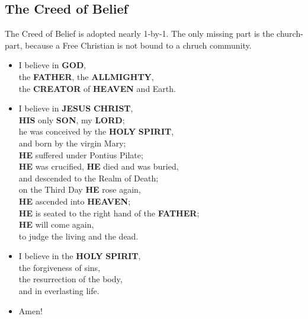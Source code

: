 \documentclass[12pt,a5paper]{article}
\newcommand{\Allmighty}[0]{\textbf{ALLMIGHTY}}
\newcommand{\Christ}[0]{\textbf{CHRIST}}
\newcommand{\Creator}[0]{\textbf{CREATOR}}
\newcommand{\God}[0]{\textbf{GOD}}
\newcommand{\Father}[0]{\textbf{FATHER}}
\newcommand{\He}[0]{\textbf{HE}}
\newcommand{\Heaven}[0]{\textbf{HEAVEN}}
\newcommand{\His}[0]{\textbf{HIS}}
\newcommand{\Holy}[0]{\textbf{HOLY}}
\newcommand{\Jesus}[0]{\textbf{JESUS}}
\newcommand{\Lord}[0]{\textbf{LORD}}
\newcommand{\Son}[0]{\textbf{SON}}
\newcommand{\Spirit}[0]{\textbf{SPIRIT}}
\begin{document}
	\subsection{The Creed of Belief}
		The Creed of Belief is adopted nearly 1-by-1.
		The only missing part is the church-part,
		because a Free Christian is not bound to a chruch community.
		\\
		\begin{itemize}[nosep]
			\item	I believe in {\God},
			\\		the {\Father},
					the {\Allmighty},
			\\		the {\Creator} of {\Heaven} and Earth.
			\item	I believe in {\Jesus} {\Christ},
			\\		{\His} only {\Son},
					my {\Lord};
			\\		he was conceived by the {\Holy} {\Spirit},
			\\		and born by the virgin Mary;
			\\		{\He} suffered under Pontius Pilate;
			\\		{\He} was crucified, {\He} died and was buried,
			\\		and descended to the Realm of Death;
			\\		on the Third Day {\He} rose again,
			\\		{\He} ascended into {\Heaven};
			\\		{\He} is seated to the right hand of the {\Father};
			\\		{\He} will come again,
			\\		to judge the living and the dead.
			\item	I believe in the {\Holy} {\Spirit},
			\\		the forgiveness of sins,
			\\		the resurrection of the body,
			\\		and in everlasting life.
			\item	Amen!
		\end{itemize}

	
\end{document}
